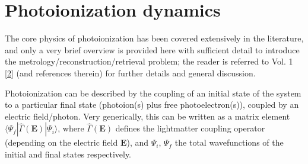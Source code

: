 \documentclass[letterpaper,table,10pt,english]{jupyterBook}
\begin{document}
\section{Photoionization dynamics}
\label{\detokenize{part1/theory_photoionization_dynamics_140723:photoionization-dynamics}}\label{\detokenize{part1/theory_photoionization_dynamics_140723:sec-dynamics-intro}}\label{\detokenize{part1/theory_photoionization_dynamics_140723::doc}}
\sphinxAtStartPar
The core physics of photoionization has been covered extensively in the literature, and only a very brief overview is provided here with sufficient detail to introduce the metrology/reconstruction/retrieval problem; the reader is referred to  Vol. 1 {[}\hyperlink{cite.backmatter/bibliography:id663}{2}{]} (and references therein) for further details and general discussion.

\sphinxAtStartPar
Photoionization can be described by the coupling of an initial state of the system to a particular final state (photoion(s) plus free photoelectron(s)), coupled by an electric field/photon. Very generically, this can be written as a matrix element \(\langle\Psi_f|\hat{\Gamma}(\boldsymbol{\mathbf{E}})|\Psi_i\rangle\), where \(\hat{\Gamma}(\boldsymbol{\mathbf{E}})\) defines the light\sphinxhyphen{}matter coupling operator (depending on the electric field \(\boldsymbol{\mathbf{E}}\)), and \(\Psi_i\), \(\Psi_f\) the total wavefunctions of the initial and final states respectively.
\end{document}
